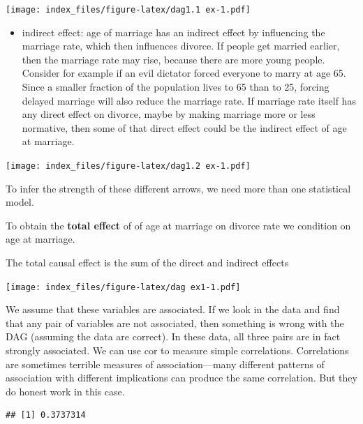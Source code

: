 \documentclass[
]{article}
\newenvironment{Shaded}{\begin{snugshade}}{\end{snugshade}}
\newcommand{\KeywordTok}[1]{\textcolor[rgb]{0.13,0.29,0.53}{\textbf{#1}}}
\newcommand{\NormalTok}[1]{#1}
\newcommand{\OperatorTok}[1]{\textcolor[rgb]{0.81,0.36,0.00}{\textbf{#1}}}
\providecommand{\tightlist}{%
  \setlength{\itemsep}{0pt}\setlength{\parskip}{0pt}}
\begin{document}
\texttt{[image: index\_files/figure-latex/dag1.1 ex-1.pdf]}

\begin{itemize}
\tightlist
\item
  indirect effect: age of marriage has an indirect effect by influencing
  the marriage rate, which then influences divorce. If people get
  married earlier, then the marriage rate may rise, because there are
  more young people. Consider for example if an evil dictator forced
  everyone to marry at age 65. Since a smaller fraction of the
  population lives to 65 than to 25, forcing delayed marriage will also
  reduce the marriage rate. If marriage rate itself has any direct
  effect on divorce, maybe by making marriage more or less normative,
  then some of that direct effect could be the indirect effect of age at
  marriage.
\end{itemize}

\texttt{[image: index\_files/figure-latex/dag1.2 ex-1.pdf]}

To infer the strength of these different arrows, we need more than one
statistical model.

To obtain the \textbf{total effect} of of age at marriage on divorce
rate we condition on age at marriage.

The total causal effect is the sum of the direct and indirect effects

\texttt{[image: index\_files/figure-latex/dag ex1-1.pdf]}

We assume that these variables are associated. If we look in the data
and find that any pair of variables are not associated, then something
is wrong with the DAG (assuming the data are correct). In these data,
all three pairs are in fact strongly associated. We can use cor to
measure simple correlations. Correlations are sometimes terrible
measures of association---many different patterns of association with
different implications can produce the same correlation. But they do
honest work in this case.

\begin{Shaded}
\end{Shaded}

\begin{verbatim}
## [1] 0.3737314
\end{verbatim}
\end{document}
